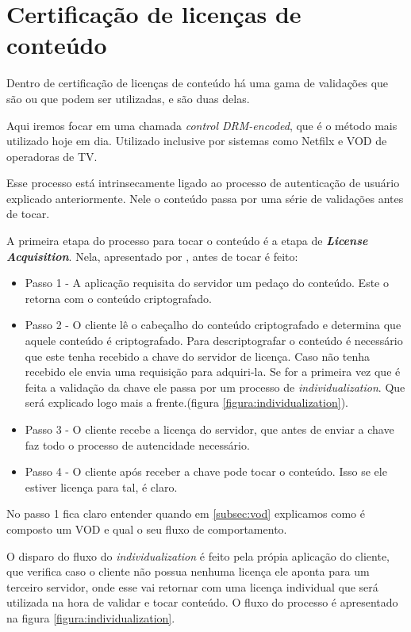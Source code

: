 \section{Certifica\c{c}\~ao de licen\c{c}as de conte\'udo}
\label{subsection:autenticacao_conteudo}
Dentro de certifica\c{c}\~ao de licen\c{c}as de conte\'udo h\'a uma gama de valida\c{c}\~oes que s\~ao ou que podem ser utilizadas, \cite{wein2012content} e \cite{leighton2007html} s\~ao duas delas.

Aqui iremos focar em uma chamada \textit{control DRM-encoded}, que \'e o m\'etodo mais utilizado hoje em dia. Utilizado inclusive por sistemas como Netfilx e VOD de operadoras de TV.

Esse processo est\'a intrinsecamente ligado ao processo de autentica\c{c}\~ao de usu\'ario explicado anteriormente. Nele o conte\'udo passa por uma s\'erie de valida\c{c}\~oes antes de tocar.

A primeira etapa do processo para tocar o conte\'udo \'e a etapa de \textbf{\textit{License Acquisition}}. Nela, apresentado por \cite{pomelo2009analysis}, antes de tocar \'e feito:
\begin{itemize}
\item Passo 1 -  A aplica\c{c}\~ao requisita do servidor um peda\c{c}o do conte\'udo. Este o retorna com o conte\'udo criptografado.
\item Passo 2 - O cliente l\^e o cabe\c{c}alho do conte\'udo criptografado e determina que aquele conte\'udo \'e criptografado. Para descriptografar o conte\'udo \'e necess\'ario que este tenha recebido a chave do servidor de licen\c{c}a. Caso n\~ao tenha recebido ele envia uma requisi\c{c}\~ao para adquiri-la. Se for a primeira vez que \'e feita a valida\c{c}\~ao da chave ele passa por um processo de \textit{individualization}. Que ser\'a explicado logo mais a frente.(figura \ref{figura:individualization}).
\item Passo 3 - O cliente recebe a licen\c{c}a do servidor, que antes de enviar a chave faz todo o processo de autencidade necess\'ario.
\item Passo 4 - O cliente ap\'os receber a chave pode tocar o conte\'udo. Isso se ele estiver licen\c{c}a para tal, \'e claro.
\end{itemize}

No passo 1 fica claro entender quando em \ref{subsec:vod} explicamos como \'e composto um VOD e qual o seu fluxo de comportamento.

O disparo do fluxo do \textit{individualization} \'e feito pela pr\'opia aplica\c{c}\~ao do cliente, que verifica caso o cliente n\~ao possua nenhuma licen\c{c}a ele aponta para um terceiro servidor, onde esse vai retornar com uma licen\c{c}a individual que ser\'a utilizada na hora de validar e tocar conte\'udo. O fluxo do processo \'e apresentado na figura \ref{figura:individualization}. 

